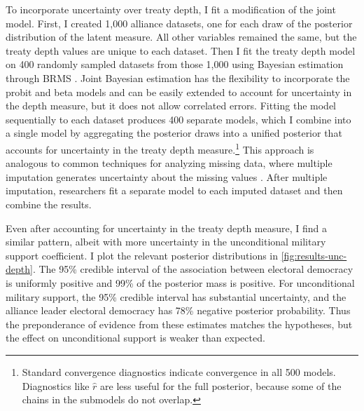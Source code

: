 \documentclass[12pt]{article}
\begin{document}
To incorporate uncertainty over treaty depth, I fit a modification of the joint model. 
First, I created 1,000 alliance datasets, one for each draw of the posterior distribution of the latent measure.
All other variables remained the same, but the treaty depth values are unique to each dataset. 
Then I fit the treaty depth model on 400 randomly sampled datasets from those 1,000 using Bayesian estimation through BRMS \citep{Buerkner2017}. 
Joint Bayesian estimation has the flexibility to incorporate the probit and beta models and can be easily extended to account for uncertainty in the depth measure, but it does not allow correlated errors. 
Fitting the model sequentially to each dataset produces 400 separate models, which I combine into a single model by aggregating the posterior draws into a unified posterior that accounts for uncertainty in the treaty depth measure.\footnote{Standard convergence diagnostics indicate convergence in all 500 models. Diagnostics like $\hat{r}$ are less useful for the full posterior, because some of the chains in the submodels do not overlap.}
This approach is analogous to common techniques for analyzing missing data, where multiple imputation generates uncertainty about the missing values \citep{Hollenbachetal2018imp}.
After multiple imputation, researchers fit a separate model to each imputed dataset and then combine the results. 


Even after accounting for uncertainty in the treaty depth measure, I find a similar pattern, albeit with more uncertainty in the unconditional military support coefficient. 
I plot the relevant posterior distributions in \autoref{fig:results-unc-depth}. 
The 95\% credible interval of the association between electoral democracy is uniformly positive and 99\% of the posterior mass is positive. 
For unconditional military support, the 95\% credible interval has substantial uncertainty, and the alliance leader electoral democracy has 78\% negative posterior probability. 
Thus the preponderance of evidence from these estimates matches the hypotheses, but the effect on unconditional support is weaker than expected. 
\end{document}

